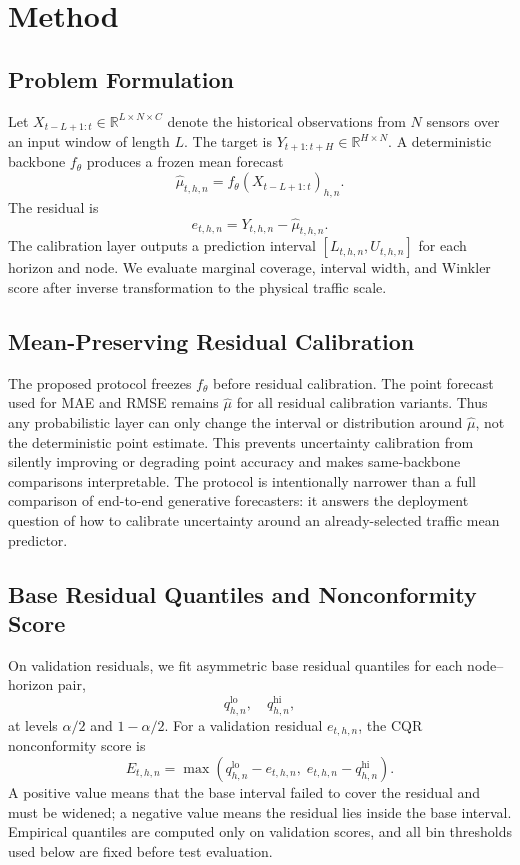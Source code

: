 \documentclass[letterpaper,journal]{IEEEtran}
\begin{document}
\section{Method}

\subsection{Problem Formulation}
Let $X_{t-L+1:t}\in\mathbb{R}^{L\times N\times C}$ denote the historical observations from $N$ sensors over an input window of length $L$. The target is $Y_{t+1:t+H}\in\mathbb{R}^{H\times N}$. A deterministic backbone $f_\theta$ produces a frozen mean forecast
\begin{equation}
    \hat{\mu}_{t,h,n}=f_\theta(X_{t-L+1:t})_{h,n}.
\end{equation}
The residual is
\begin{equation}
    e_{t,h,n}=Y_{t,h,n}-\hat{\mu}_{t,h,n}.
\end{equation}
The calibration layer outputs a prediction interval $[L_{t,h,n},U_{t,h,n}]$ for each horizon and node. We evaluate marginal coverage, interval width, and Winkler score after inverse transformation to the physical traffic scale.

\subsection{Mean-Preserving Residual Calibration}
The proposed protocol freezes $f_\theta$ before residual calibration. The point forecast used for MAE and RMSE remains $\hat{\mu}$ for all residual calibration variants. Thus any probabilistic layer can only change the interval or distribution around $\hat{\mu}$, not the deterministic point estimate. This prevents uncertainty calibration from silently improving or degrading point accuracy and makes same-backbone comparisons interpretable. The protocol is intentionally narrower than a full comparison of end-to-end generative forecasters: it answers the deployment question of how to calibrate uncertainty around an already-selected traffic mean predictor.

\subsection{Base Residual Quantiles and Nonconformity Score}
On validation residuals, we fit asymmetric base residual quantiles for each node--horizon pair,
\begin{equation}
    q^{\mathrm{lo}}_{h,n},\quad q^{\mathrm{hi}}_{h,n},
\end{equation}
at levels $\alpha/2$ and $1-\alpha/2$. For a validation residual $e_{t,h,n}$, the CQR nonconformity score is
\begin{equation}
    E_{t,h,n}=\max\left(q^{\mathrm{lo}}_{h,n}-e_{t,h,n},\; e_{t,h,n}-q^{\mathrm{hi}}_{h,n}\right).
\end{equation}
A positive value means that the base interval failed to cover the residual and must be widened; a negative value means the residual lies inside the base interval. Empirical quantiles are computed only on validation scores, and all bin thresholds used below are fixed before test evaluation.
\end{document}
